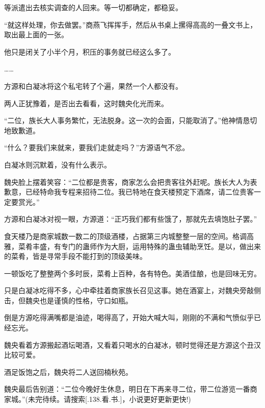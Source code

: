 \begin{this_body}
等派遣出去核实调查的人回来。等一切都确定，都稳妥。

“就这样处理，你去做罢。”商燕飞挥挥手，然后从书桌上摞得高高的一叠文书上，取出最上面的一张。

他只是闭关了小半个月，积压的事务就已经这么多了。

……

方源和白凝冰将这个私宅转了个遍，果然一个人都没有。

两人正犹豫着，是否出去看看，这时魏央化光而来。

“二位，族长大人事务繁忙，无法脱身。这一次的会面，只能取消了。”他神情恳切地致歉道。

“什么？要我们来就来，要我们走就走吗？”方源语气不忿。

白凝冰则沉默着，没有什么表示。

魏央脸上摆着笑容：“二位都是贵客，商家怎么会把贵客往外赶呢。族长大人为表歉意，已经特命我专程来招待二位。我已特地在食天楼预定下酒席，请二位贵客一定要赏光。”

方源和白凝冰对视一眼，方源道：“正巧我们都有些饿了，那就先去填饱肚子罢。”

食天楼乃是商家城数一数二的顶级酒楼，占据第三内城整整一层的空间。格调高雅，菜肴丰盛，有专门的蛊师作为大厨，运用特殊的蛊虫辅助烹饪。是以，做出来的菜肴，皆是寻常手段不能打到的顶级美味。

一顿饭吃了整整两个多时辰，菜肴上百种，各有特色。美酒佳酿，也是回味无穷。

只是白凝冰吃得不多，心中牵挂着商家族长召见这事。她在酒宴上，对魏央旁敲侧击，但魏央也是谨慎的性格，守口如瓶。

倒是方源吃得满嘴都是油迹，喝得高了，开始大喊大叫，刚刚的不满和气愤似乎已经忘光。

魏央看着方源搬起酒坛喝酒，又看着只喝水的白凝冰，顿时觉得还是方源这个丑汉比较可爱。

酒足饭饱之后，魏央将二人送回楠秋苑。

魏央最后告别道：“二位今晚好生休息，明日在下再来寻二位，带二位游览一番商家城。”(未完待续。请搜索[.138.看.书.]，小说更好更新更快!)

\end{this_body}

